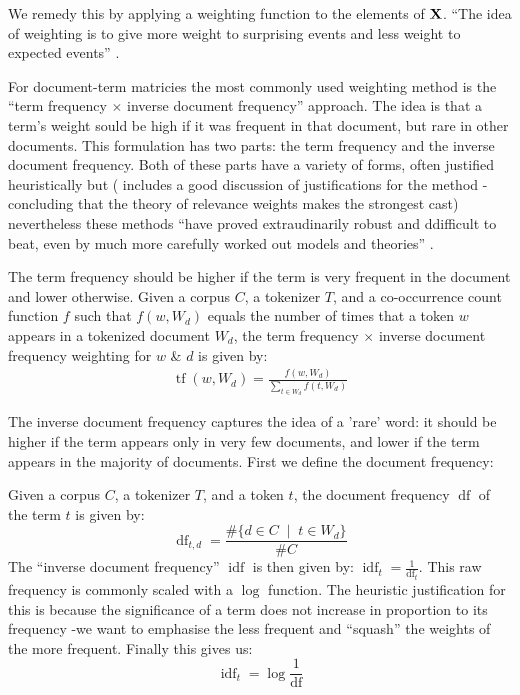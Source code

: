We remedy this by applying a weighting function to the elements of $\bf{X}$. ``The idea of weighting is to give more weight to surprising events and less weight to expected events'' \parencite{turney10-from-frequen-to-meanin}.

For document-term matricies the most commonly used weighting method is the ``term frequency $\times$ inverse document frequency'' approach. The idea is that a term's weight sould be high if it was frequent in that document, but rare in other documents. This formulation has two parts: the term frequency and the inverse document frequency. Both of these parts have a variety of forms, often justified heuristically but (\textcite{robertson-2004-understanding-idf} includes a good discussion of justifications for the method -concluding that the theory of relevance weights \parencite{robertson-1976-relevance-weighting} makes the strongest cast) nevertheless these methods ``have proved extraudinarily robust and ddifficult to beat, even by much more carefully worked out models and theories'' \parencite{robertson-2004-understanding-idf}.

\begin{definition}
  The term frequency should be higher if the term is very frequent in the document and lower otherwise.
  Given a corpus $C$, a tokenizer $T$, and a co-occurrence count function $f$ such that $f(w,W_d)$ equals the number of times that a token $w$ appears in a tokenized document $W_d$, the term frequency $\times$ inverse document frequency weighting for $w$ \& $d$ is given by:
  \begin{align}
    \operatorname{tf}(w,W_d)=\frac{f(w,W_d)}{\sum_{t\in W_d}f(t,W_d)}
  \end{align}
\end{definition}

\begin{definition}
  The inverse document frequency captures the idea of a 'rare' word: it should be higher if the term appears only in very few documents, and lower if the term appears in the majority of documents. First we define the document frequency:

  Given a corpus $C$, a tokenizer $T$, and a token $t$, the document frequency $\operatorname{df}$ of the term $t$ is given by:
  \begin{equation}
    \operatorname{df}_{t,d}=\frac{\#\{d\in C\;\mid\;t\in W_d\}}{\#C}
  \end{equation}
  The ``inverse document frequency'' $\operatorname{idf}$ is then given by: $\operatorname{idf}_t=\frac{1}{\operatorname{df}_t}$. This raw frequency is commonly scaled with a $\log$ function. The heuristic justification for this is because the significance of a term does not increase in proportion to its frequency -we want to emphasise the less frequent and ``squash'' the weights of the more frequent. Finally this gives us:
  \begin{equation}
    \operatorname{idf}_t=\log\frac{1}{\operatorname{df}}
  \end{equation}
\end{definition}

